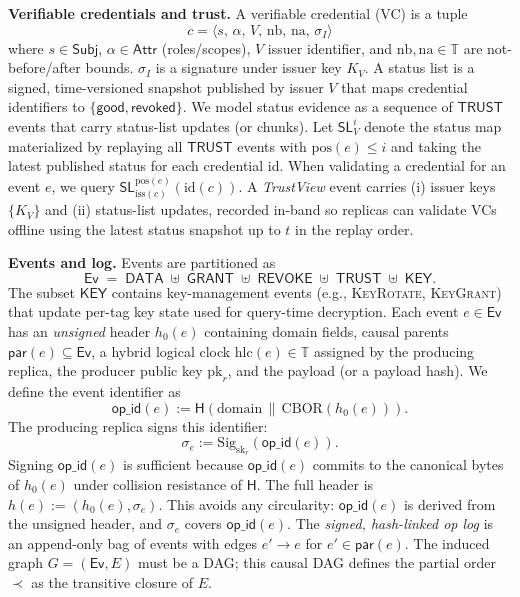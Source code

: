 \documentclass[10pt,journal,compsoc]{IEEEtran}
\begin{document}
\medskip
\noindent\textbf{Verifiable credentials and trust.}
A verifiable credential (VC) is a tuple
\[
  c = \langle s,\, \alpha,\, V,\, \mathrm{nb},\, \mathrm{na},\, \sigma_I\rangle
\]
where $s\!\in\!\mathsf{Subj}$, $\alpha\!\in\!\mathsf{Attr}$ (roles/scopes), $V$ issuer identifier,
and $\mathrm{nb},\mathrm{na}\!\in\!\mathbb{T}$ are not-before/after bounds.
$\sigma_I$ is a signature under issuer key $K_V$.
A status list is a signed, time-versioned snapshot published by issuer $V$ that maps credential identifiers to $\{\mathsf{good},\mathsf{revoked}\}$.
We model status evidence as a sequence of $\mathsf{TRUST}$ events that carry status-list updates (or chunks).
Let $\mathsf{SL}^{i}_{V}$ denote the status map materialized by replaying all $\mathsf{TRUST}$ events with $\mathrm{pos}(e) \le i$ and taking the latest published status for each credential id.
When validating a credential for an event $e$, we query $\mathsf{SL}^{\mathrm{pos}(e)}_{\mathrm{iss}(c)}(\mathrm{id}(c))$.
A \emph{TrustView} event carries (i) issuer keys $\{K_V\}$ and (ii) status-list updates, recorded in-band so replicas can validate VCs offline using the latest status snapshot up to $t$ in the replay order.

\medskip
\noindent\textbf{Events and log.}
Events are partitioned as
\[
  \mathsf{Ev} \;=\; \mathsf{DATA}\;\uplus\;\mathsf{GRANT}\;\uplus\;\mathsf{REVOKE}\;\uplus\;\mathsf{TRUST}\;\uplus\;\mathsf{KEY}.
\]
The subset $\mathsf{KEY}$ contains key-management events (e.g., \textsc{KeyRotate}, \textsc{KeyGrant}) that update per-tag key state used for query-time decryption.
Each event $e\in\mathsf{Ev}$ has an \emph{unsigned} header $h_0(e)$ containing domain fields, causal parents $\mathsf{par}(e)\subseteq\mathsf{Ev}$, a hybrid logical clock $\mathrm{hlc}(e)\in\mathbb{T}$ assigned by the producing replica, the producer public key $\mathrm{pk}_r$, and the payload (or a payload hash). We define the event identifier as
\[
  \mathsf{op\_id}(e) := \mathsf{H}(\mathrm{domain}\,\|\,\mathrm{CBOR}(h_0(e))).
\]
The producing replica signs this identifier:
\[
  \sigma_e := \mathrm{Sig}_{\mathrm{sk}_r}(\mathsf{op\_id}(e)).
\]
Signing $\mathsf{op\_id}(e)$ is sufficient because $\mathsf{op\_id}(e)$ commits to the canonical bytes of $h_0(e)$ under collision resistance of $\mathsf{H}$.
The full header is $h(e) := (h_0(e), \sigma_e)$. This avoids any circularity: $\mathsf{op\_id}(e)$ is derived from the unsigned header, and $\sigma_e$ covers $\mathsf{op\_id}(e)$.
The \emph{signed, hash-linked op log} is an append-only bag of events with edges $e'\!\to\! e$ for $e'\in\mathsf{par}(e)$.
The induced graph $G=(\mathsf{Ev},E)$ must be a DAG; this causal DAG defines the partial order $\prec$ as the transitive closure of $E$.
\end{document}
